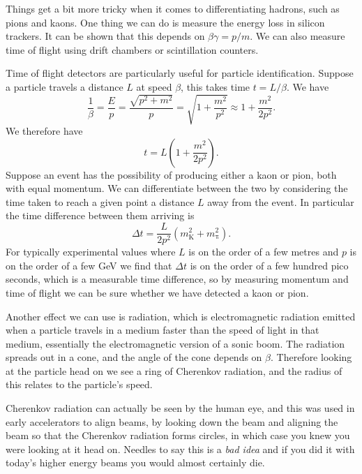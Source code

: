 \documentclass[fleqn]{NotesClass}
\makeatletter
\newcommand{\PBASE@pion}{\uppi}
\newcommand{\Ppi}{\ensuremath{\PBASE@pion}}
\newcommand{\PBASE@kaon}{\mathrm{K}}
\newcommand{\Pkaon}{\ensuremath{\PBASE@kaon}}
\makeatother
\begin{document}
    Things get a bit more tricky when it comes to differentiating hadrons, such as pions and kaons.
    One thing we can do is measure the energy loss in silicon trackers.
    It can be shown that this depends on \(\beta \gamma = p/m\).
    We can also measure time of flight using drift chambers or scintillation counters.
    
    Time of flight detectors are particularly useful for particle identification.
    Suppose a particle travels a distance \(L\) at speed \(\beta\), this takes time \(t = L/\beta\).
    We have
    \begin{equation}
        \frac{1}{\beta} = \frac{E}{p} = \frac{\sqrt{p^2 + m^2}}{p} = \sqrt{1 + \frac{m^2}{p^2}} \approx 1 + \frac{m^2}{2p^2}.
    \end{equation}
    We therefore have
    \begin{equation}
        t = L\left( 1 + \frac{m^2}{2p^2} \right).
    \end{equation}
    Suppose an event has the possibility of producing either a kaon or pion, both with equal momentum.
    We can differentiate between the two by considering the time taken to reach a given point a distance \(L\) away from the event.
    In particular the time difference between them arriving is
    \begin{equation}
        \Delta t = \frac{L}{2p^2}(m_{\Pkaon}^2 + m_{\Ppi}^2).
    \end{equation}
    For typically experimental values where \(L\) is on the order of a few metres and \(p\) is on the order of a few \unit{\giga\electronvolt} we find that \(\Delta t\) is on the order of a few hundred pico seconds, which is a measurable time difference, so by measuring momentum and time of flight we can be sure whether we have detected a kaon or pion.
    
    Another effect we can use is  radiation, which is electromagnetic radiation emitted when a particle travels in a medium faster than the speed of light in that medium, essentially the electromagnetic version of a sonic boom.
    The radiation spreads out in a cone, and the angle of the cone depends on \(\beta\).
    Therefore looking at the particle head on we see a ring of Cherenkov radiation, and the radius of this relates to the particle's speed.
    
    Cherenkov radiation can actually be seen by the human eye, and this was used in early accelerators to align beams, by looking down the beam and aligning the beam so that the Cherenkov radiation forms circles, in which case you knew you were looking at it head on.
    Needles to say this is a \emph{bad idea} and if you did it with today's higher energy beams you would almost certainly die.
    
\end{document}
